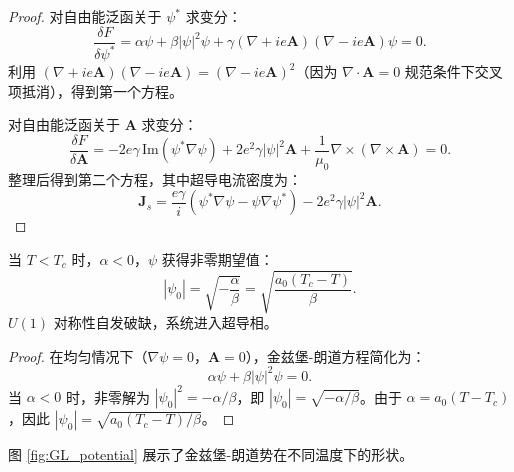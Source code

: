 \begin{proof}
对自由能泛函关于 $\psi^*$ 求变分：
\begin{equation}
    \frac{\delta F}{\delta \psi^*} = \alpha \psi + \beta |\psi|^2 \psi + \gamma (\nabla + ie\mathbf{A})(\nabla - ie\mathbf{A})\psi = 0.
\end{equation}
利用 $(\nabla + ie\mathbf{A})(\nabla - ie\mathbf{A}) = (\nabla - ie\mathbf{A})^2$（因为 $\nabla \cdot \mathbf{A} = 0$ 规范条件下交叉项抵消），得到第一个方程。

对自由能泛函关于 $\mathbf{A}$ 求变分：
\begin{equation}
    \frac{\delta F}{\delta \mathbf{A}} = -2e\gamma \, \text{Im}(\psi^* \nabla \psi) + 2e^2 \gamma |\psi|^2 \mathbf{A} + \frac{1}{\mu_0} \nabla \times (\nabla \times \mathbf{A}) = 0.
\end{equation}
整理后得到第二个方程，其中超导电流密度为：
\begin{equation}
    \mathbf{J}_s = \frac{e\gamma}{i}(\psi^* \nabla \psi - \psi \nabla \psi^*) - 2e^2 \gamma |\psi|^2 \mathbf{A}.
\end{equation}
\end{proof}

\begin{theorem}[超导序参量的平衡值]
当 $T < T_c$ 时，$\alpha < 0$，$\psi$ 获得非零期望值：
\begin{equation}
    |\psi_0| = \sqrt{-\frac{\alpha}{\beta}} = \sqrt{\frac{a_0(T_c - T)}{\beta}}.
\end{equation}
$U(1)$ 对称性自发破缺，系统进入超导相。
\end{theorem}

\begin{proof}
在均匀情况下（$\nabla \psi = 0$，$\mathbf{A} = 0$），金兹堡-朗道方程简化为：
\begin{equation}
    \alpha \psi + \beta |\psi|^2 \psi = 0.
\end{equation}
当 $\alpha < 0$ 时，非零解为 $|\psi_0|^2 = -\alpha/\beta$，即 $|\psi_0| = \sqrt{-\alpha/\beta}$。由于 $\alpha = a_0(T - T_c)$，因此 $|\psi_0| = \sqrt{a_0(T_c - T)/\beta}$。
\end{proof}

图 \ref{fig:GL_potential} 展示了金兹堡-朗道势在不同温度下的形状。

